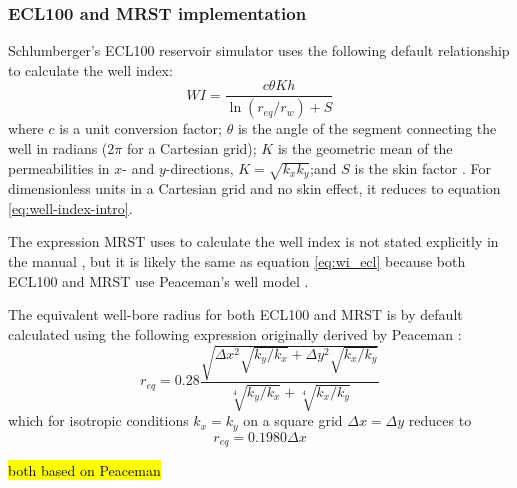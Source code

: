 \subsubsection{ECL100 and MRST implementation} %
\label{ssub:ecl100_implementation}
Schlumberger's ECL100 reservoir simulator uses the following default relationship to calculate the well index:
\begin{equation}
    \label{eq:wi_ecl}
    WI = \frac{c\theta K h}{\ln \left(r_{eq}/r_w\right)+S}
\end{equation}
where $c$ is a unit conversion factor; $\theta$ is the angle of the segment connecting the well in radians ($2\pi$ for a Cartesian grid); $K$ is the geometric mean of the permeabilities in $x$- and $y$-directions, $K=\sqrt{k_x k_y}$;and $S$ is the skin factor \cite{Schlumberger2013Eclipse}. For dimensionless units in a Cartesian grid and no skin effect, it reduces to equation \eqref{eq:well-index-intro}.

The expression MRST uses to calculate the well index is not stated explicitly in the manual \cite{Lie2014Introduction}, but it is likely the same as equation \eqref{eq:wi_ecl} because both ECL100 and MRST use Peaceman's well model \cite{Lie2014Introduction}.

The equivalent well-bore radius for both ECL100 and MRST is by default calculated using the following expression \cite{Schlumberger2013Eclipse,Lie2014Introduction} originally derived by Peaceman \cite{Peaceman1983Interpretation}:
\begin{equation}
    r_{eq} = 0.28 \frac{\sqrt{\Delta x^2 \sqrt{k_y/k_x} + \Delta y^2 \sqrt{k_x/k_y}}}{\sqrt[4]{k_y/k_x}+\sqrt[4]{k_x/k_y}}
\end{equation}
which for isotropic conditions $k_x=k_y$ on a square grid $\Delta x= \Delta y$ reduces to
\begin{equation}
    r_{eq} = 0.1980 \Delta x
\end{equation}

\hl{both based on Peaceman}


